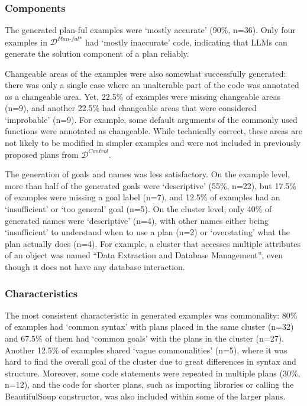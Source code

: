 \subsubsection{Components}
\label{sec:qual_components}

The generated plan-ful examples were `mostly accurate' (90\%, n=36). Only four examples in \(\mathcal{D}^{\textit{Plan-ful*}}\) had `mostly inaccurate' code, indicating that LLMs can generate the solution component of a plan reliably.

Changeable areas of the examples were also somewhat successfully generated: there was only a single case where an unalterable part of the code was annotated as a changeable area. Yet, 22.5\% of examples were missing changeable areas (n=9), and another 22.5\% had changeable areas that were considered `improbable' (n=9). For example, some default arguments of the commonly used functions were annotated as changeable. While technically correct, these areas are not likely to be modified in simpler examples and were not included in previously proposed plans from \(\mathcal{D}^{\textit{Control}}\).

The generation of goals and names was less satisfactory. On the example level, more than half of the generated goals were `descriptive' (55\%, n=22), but 17.5\% of examples were missing a goal label (n=7), and 12.5\% of examples had an `insufficient' or `too general' goal (n=5). On the cluster level, only 40\% of generated names were `descriptive' (n=4), with other names either being `insufficient' to understand when to use a plan (n=2) or `overstating' what the plan actually does (n=4). For example, a cluster that accesses multiple attributes of an object was named ``Data Extraction and Database Management'', even though it does not have any database interaction.

\subsubsection{Characteristics}
\label{sec:qual_characteristics}

The most consistent characteristic in generated examples was commonality: 80\% of examples had `common syntax' with plans placed in the same cluster (n=32) and 67.5\% of them had `common goals' with the plans in the cluster (n=27). Another 12.5\% of examples shared `vague commonalities' (n=5), where it was hard to find the overall goal of the cluster due to great differences in syntax and structure. Moreover, some code statements were repeated in multiple plans (30\%, n=12), and the code for shorter plans, such as importing libraries or calling the BeautifulSoup constructor, was also included within some of the larger plans.

